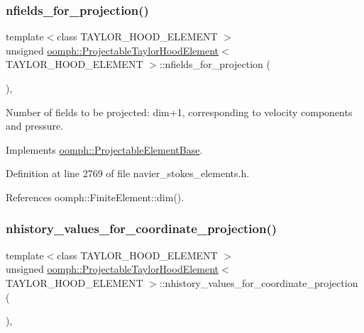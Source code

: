 \subsubsection{\texorpdfstring{nfields\+\_\+for\+\_\+projection()}{nfields\_for\_projection()}}
{\footnotesize\ttfamily template$<$class T\+A\+Y\+L\+O\+R\+\_\+\+H\+O\+O\+D\+\_\+\+E\+L\+E\+M\+E\+NT $>$ \\
unsigned \hyperlink{classoomph_1_1ProjectableTaylorHoodElement}{oomph\+::\+Projectable\+Taylor\+Hood\+Element}$<$ T\+A\+Y\+L\+O\+R\+\_\+\+H\+O\+O\+D\+\_\+\+E\+L\+E\+M\+E\+NT $>$\+::nfields\+\_\+for\+\_\+projection (\begin{DoxyParamCaption}{ }\end{DoxyParamCaption})\hspace{0.3cm}{\ttfamily [inline]}, {\ttfamily [virtual]}}



Number of fields to be projected\+: dim+1, corresponding to velocity components and pressure. 



Implements \hyperlink{classoomph_1_1ProjectableElementBase_a44634aa4049332a580d249c25564638c}{oomph\+::\+Projectable\+Element\+Base}.



Definition at line 2769 of file navier\+\_\+stokes\+\_\+elements.\+h.



References oomph\+::\+Finite\+Element\+::dim().

\mbox{\label{classoomph_1_1ProjectableTaylorHoodElement_a7b93892cedb3a4da3dc9f30c186fdec4}} 
\subsubsection{\texorpdfstring{nhistory\+\_\+values\+\_\+for\+\_\+coordinate\+\_\+projection()}{nhistory\_values\_for\_coordinate\_projection()}}
{\footnotesize\ttfamily template$<$class T\+A\+Y\+L\+O\+R\+\_\+\+H\+O\+O\+D\+\_\+\+E\+L\+E\+M\+E\+NT $>$ \\
unsigned \hyperlink{classoomph_1_1ProjectableTaylorHoodElement}{oomph\+::\+Projectable\+Taylor\+Hood\+Element}$<$ T\+A\+Y\+L\+O\+R\+\_\+\+H\+O\+O\+D\+\_\+\+E\+L\+E\+M\+E\+NT $>$\+::nhistory\+\_\+values\+\_\+for\+\_\+coordinate\+\_\+projection (\begin{DoxyParamCaption}{ }\end{DoxyParamCaption})\hspace{0.3cm}{\ttfamily [inline]}, {\ttfamily [virtual]}}



